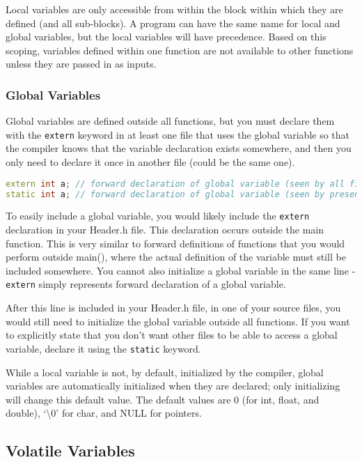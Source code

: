 \documentclass[10pt]{article}
\begin{document}
Local variables are only accessible from within the block within which they are defined (and all sub-blocks). A program can have the same name for local and global variables, but the local variables will have precedence. Based on this scoping, variables defined within one function are not available to other functions unless they are passed in as inputs.

\subsubsection{Global Variables}

Global variables are defined outside all functions, but you must declare them with the \texttt{extern} keyword in at least one file that uses the global variable so that the compiler knows that the variable declaration exists somewhere, and then you only need to declare it once in another file (could be the same one). 

\begin{lstlisting}[language=C++]
extern int a; // forward declaration of global variable (seen by all files)
static int a; // forward declaration of global variable (seen by present file)
\end{lstlisting}

To easily include a global variable, you would likely include the \texttt{extern} declaration in your Header.h file. This declaration occurs outside the main function. This is very similar to forward definitions of functions that you would perform outside main(), where the actual definition of the variable must still be included somewhere. You cannot also initialize a global variable in the same line - \texttt{extern} simply represents forward declaration of a global variable.

After this line is included in your Header.h file, in one of your source files, you would still need to initialize the global variable outside all functions. If you want to explicitly state that you don't want other files to be able to access a global variable, declare it using the \texttt{static} keyword.

While a local variable is not, by default, initialized by the compiler, global variables are automatically initialized when they are declared; only initializing will change this default value. The default values are 0 (for int, float, and double), `\textbackslash 0' for char, and NULL for pointers.

\subsection{Volatile Variables}
\end{document}
